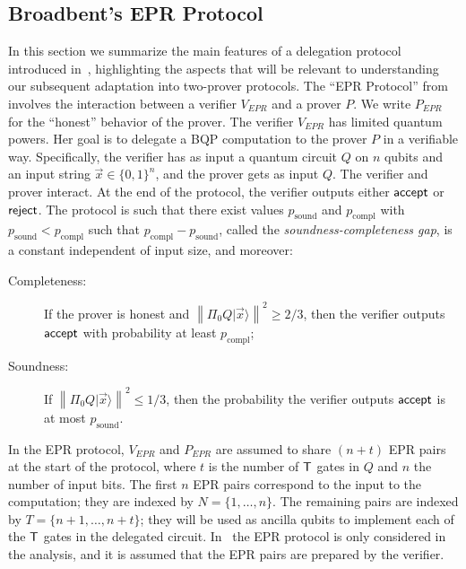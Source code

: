\documentclass[11pt]{article}
\newcommand{\ket}[1]{|#1\rangle}
\newcommand{\norm}[1]{\left\|#1\right\|}
\begin{document}
\subsection{Broadbent's EPR Protocol}
\label{sec:EPR-protocol}


In this section we summarize the main features of a delegation protocol introduced in~\cite{broadbent15howtoverify}, highlighting the aspects that will be relevant to understanding our subsequent adaptation into two-prover protocols. The ``EPR Protocol'' from \cite{broadbent15howtoverify} involves the interaction between a verifier $V_{EPR}$ and a prover $P$. We write $P_{EPR}$ for the ``honest'' behavior of the prover. The verifier $V_{EPR}$ has limited quantum powers. Her goal is to delegate a BQP computation to the prover $P$ in a verifiable way. Specifically, the verifier has as input a quantum circuit $Q$ on $n$ qubits and an input string $\vec{x}\in\{0,1\}^n$, and the prover gets as input $Q$. The verifier and prover interact. At the end of the protocol, the verifier outputs either $\sf accept$ or $\sf reject$. The protocol is such that there exist values $p_{\mathrm{sound}}$ and $p_{\mathrm{compl}}$ with $p_{\mathrm{sound}}< p_{\mathrm{compl}}$ such that $p_{\mathrm{compl}}-p_{\mathrm{sound}}$, called the \emph{soundness-completeness gap}, is a constant independent of input size, and moreover:

\begin{description}
\item[Completeness:] If the prover is honest and $\norm{\Pi_0Q\ket{\vec{x}}}^2 \geq 2/3$, then the verifier outputs $\sf accept$ with probability at least $p_{\mathrm{compl}}$;  
\item[Soundness:] If $\norm{\Pi_0Q\ket{\vec{x}}}^2 \leq 1/3$, then the probability the verifier outputs $\sf accept$ is at most $p_{\mathrm{sound}}$.
\end{description}




In the EPR protocol, $V_{EPR}$ and $P_{EPR}$ are assumed to share $(n+t)$ EPR pairs at the start of the protocol, where $t$ is the number of $\sf T$ gates in $Q$ and $n$ the number of input bits. 
 The first $n$ EPR pairs correspond to the input to the computation; they are indexed by $N=\{1,\dots,n\}$. The remaining pairs are indexed by $T=\{n+1,\dots,n+t\}$; they will be used as ancilla qubits to  implement each of the $\sf T$ gates in the delegated circuit. 
 In~\cite{broadbent15howtoverify} the EPR protocol is only considered in the analysis, and it is assumed that the EPR pairs are prepared by the verifier.
\end{document}
